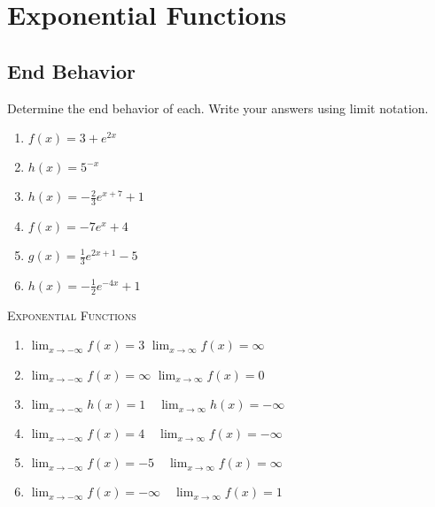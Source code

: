 \chapter{Exponential Functions}

\section{End Behavior}

Determine the end behavior of each. Write your answers using limit notation.
\begin{enumerate}
	\item $f(x) = 3 + e^{2x}$
	\item $h(x) = 5^{-x}$
	\item $h(x) = -\frac{2}{3}e^{x+7} + 1$
	\item $f(x) = -7e^x + 4$
	\item $g(x) = \frac{1}{3}e^{2x+1}-5$
	\item $h(x) = -\frac{1}{2}e^{-4x} + 1$
\end{enumerate}

\newpage

\textsc{Exponential Functions}

\begin{enumerate}
	\item $\lim_{x \to -\infty} f(x) = 3$ \quad $\lim_{x \to \infty} f(x) = \infty$
	\item $\lim_{x \to -\infty} f(x) = \infty$ \quad $\lim_{x \to \infty} f(x) =0$ 
	\item $\lim_{x \to -\infty} h(x) = 1 \quad \lim_{x \to \infty} h(x) = - \infty$
	\item $\lim_{x \to -\infty} f(x) = 4 \quad \lim_{x \to \infty} f(x) = -\infty$
    \item $\lim_{x \to -\infty} f(x) = -5 \quad \lim_{x \to \infty} f(x) = \infty$
    \item $\lim_{x \to -\infty} f(x) = -\infty \quad \lim_{x \to \infty} f(x) = 1$
\end{enumerate}
